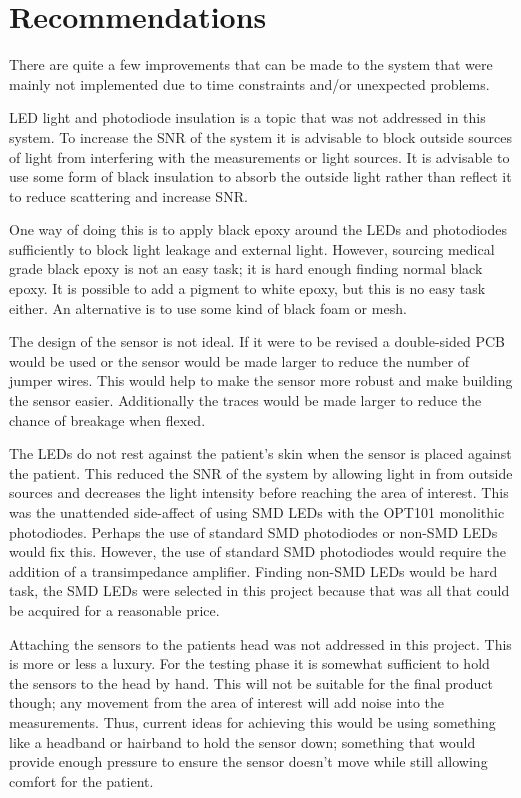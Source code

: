 \chapter {Recommendations}

There are quite a few improvements that can be made to the system that were mainly not implemented due to time constraints and/or unexpected problems.

LED light and photodiode insulation is a topic that was not addressed in this system. To increase the SNR of the system it is advisable to block outside sources of light from interfering with the measurements or light sources. It is advisable to use some form of black insulation to absorb the outside light rather than reflect it to reduce scattering and increase SNR. 

One way of doing this is to apply black epoxy around the LEDs and photodiodes sufficiently to block light leakage and external light. However, sourcing medical grade black epoxy is not an easy task; it is hard enough finding normal black epoxy. It is possible to add a pigment to white epoxy, but this is no easy task either. An alternative is to use some kind of black foam or mesh.

The design of the sensor is not ideal. If it were to be revised a double-sided PCB would be used or the sensor would be made larger to reduce the number of jumper wires. This would help to make the sensor more robust and make building the sensor easier. Additionally the traces would be made larger to reduce the chance of breakage when flexed. 

The LEDs do not rest against the patient's skin when the sensor is placed against the patient. This reduced the SNR of the system by allowing light in from outside sources and decreases the light intensity before reaching the area of interest. This was the unattended side-affect of using SMD LEDs with the OPT101 monolithic photodiodes. Perhaps the use of standard SMD photodiodes or non-SMD LEDs would fix this. However, the use of standard SMD photodiodes would require the addition of a transimpedance amplifier. Finding non-SMD LEDs would be hard task, the SMD LEDs were selected in this project because that was all that could be acquired for a reasonable price. 

Attaching the sensors to the patients head was not addressed in this project. This is more or less a luxury. For the testing phase it is somewhat sufficient to hold the sensors to the head by hand. This will not be suitable for the final product though; any movement from the area of interest will add noise into the measurements. Thus, current ideas for achieving this would be using something like a headband or hairband to hold the sensor down; something that would provide enough pressure to ensure the sensor doesn't move while still allowing comfort for the patient.


